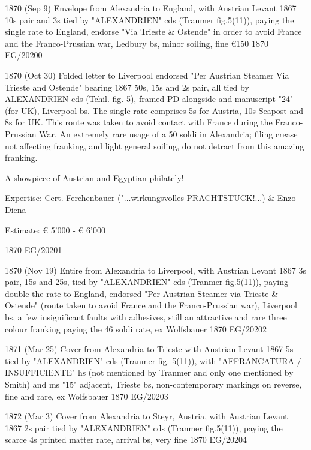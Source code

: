 \documentclass[justified]{tufte-book}
\begin{document}
%
{1870 (Sep 9) Envelope from Alexandria to England, with Austrian Levant 1867 10s pair and 3s tied by "ALEXANDRIEN" cds (Tranmer fig.5(11)), paying the single rate to England, endorse "Via Trieste \& Ostende" in order to avoid France and the Franco-Prussian war, Ledbury bs, minor soiling, fine
\euro 150}
{1870}%
{EG/20200}%
{}%
{}
{}%
{}


%
{1870 (Oct 30) Folded letter to Liverpool endorsed "Per Austrian Steamer Via Trieste and Ostende" bearing 1867 50s, 15s and 2s pair, all tied by ALEXANDRIEN cds (Tchil. fig. 5), framed PD alongside and manuscript "24" (for UK), Liverpool bs. The single rate comprises 5s for Austria, 10s Seapost and 8s for UK. This route was taken to avoid contact with France during the Franco-Prussian War. An extremely rare usage of a 50 soldi in Alexandria; filing crease not affecting franking, and light general soiling, do not detract from this amazing franking.

A showpiece of Austrian and Egyptian philately! 

Expertise: Cert. Ferchenbauer ("...wirkungsvolles PRACHTSTUCK!...) \& Enzo Diena

Estimate: € 5'000 - € 6'000
}
{1870}%
{EG/20201}%
{}%
{}
{}%
{}

%
{1870 (Nov 19) Entire from Alexandria to Liverpool, with Austrian Levant 1867 3s pair, 15s and 25s, tied by "ALEXANDRIEN" cds (Tranmer fig.5(11)), paying double the rate to England, endorsed "Per Austrian Steamer via Trieste \& Ostende" (route taken to avoid France and the Franco-Prussian war), Liverpool bs, a few insignificant faults with adhesives, still an attractive and rare three colour franking paying the 46 soldi rate, ex Wolfsbauer
}
{1870}%
{EG/20202}%
{}%
{}
{}%
{}

%
{1871 (Mar 25) Cover from Alexandria to Trieste with Austrian Levant 1867 5s tied by "ALEXANDRIEN" cds (Tranmer fig. 5(11)), with "AFFRANCATURA / INSUFFICIENTE" hs (not mentioned by Tranmer and only one mentioned by Smith) and ms "15" adjacent, Trieste bs, non-contemporary markings on reverse, fine and rare, ex Wolfsbauer
}
{1870}%
{EG/20203}%
{}%
{}
{}%
{}

%
{1872 (Mar 3) Cover from Alexandria to Steyr, Austria, with Austrian Levant 1867 2s pair tied by "ALEXANDRIEN" cds (Tranmer fig.5(11)), paying the scarce 4s printed matter rate, arrival bs, very fine
}
{1870}%
{EG/20204}%
{}%
{}
{}%
{}
\end{document}

